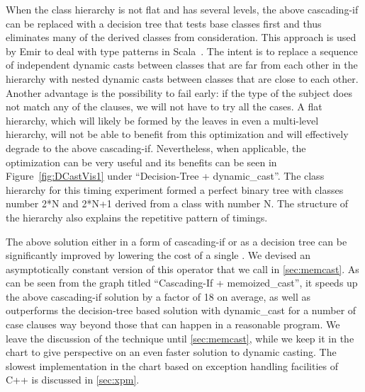 
When the class hierarchy is not flat and has several levels, the above cascading-if can be replaced 
with a decision tree that tests base classes first and thus eliminates many of 
the derived classes from consideration. This approach is used by Emir to deal with 
type patterns in Scala~\cite[]{EmirThesis}. The intent is to 
replace a sequence of independent dynamic casts between classes that are far 
from each other in the hierarchy with nested dynamic casts between classes that 
are close to each other. Another advantage is the possibility to fail early: 
if the type of the subject does not match any of the clauses, we will not have to try all the cases. 
A flat hierarchy, which will likely be formed by the leaves in even a multi-level 
hierarchy, will not be able to benefit from this optimization and 
will effectively degrade to the above cascading-if. Nevertheless, when 
applicable, the optimization can be very useful and its benefits can be seen in
Figure~\ref{fig:DCastVis1} under ``Decision-Tree + dynamic\_cast''. The class 
hierarchy for this timing experiment formed a perfect binary tree with 
classes number 2*N and 2*N+1 derived from a class with number N. The structure 
of the hierarchy also explains the repetitive pattern of timings.

The above solution either in a form of cascading-if or as a decision tree can be 
significantly improved by lowering the cost of a single . 
We devised an asymptotically constant version of this operator that we call
 in \textsection\ref{sec:memcast}. As can be seen 
from the graph titled ``Cascading-If + memoized\_cast'', it speeds up the 
above cascading-if solution by a factor of 18 on average, as well as outperforms 
the decision-tree based solution with dynamic\_cast for a number of case clauses 
way beyond those that can happen in a reasonable program. 
We leave the discussion of the technique until 
\textsection\ref{sec:memcast}, while we keep it in the chart to give perspective on 
an even faster solution to dynamic casting. The slowest implementation in the 
chart based on exception handling facilities of C++ is discussed in 
\textsection\ref{sec:xpm}.

